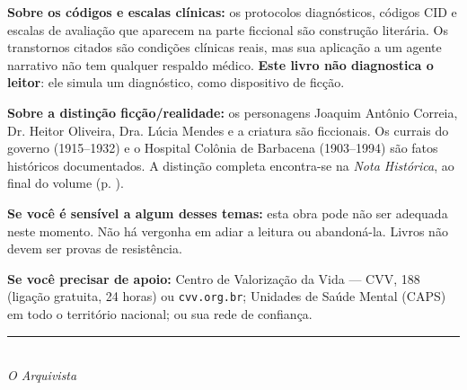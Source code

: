 \noindent \textbf{Sobre os códigos e escalas clínicas:} os protocolos diagnósticos, códigos CID e escalas de avaliação que aparecem na parte ficcional são construção literária. Os transtornos citados são condições clínicas reais, mas sua aplicação a um agente narrativo não tem qualquer respaldo médico. \textbf{Este livro não diagnostica o leitor}: ele simula um diagnóstico, como dispositivo de ficção.

\vspace{1em}

\noindent \textbf{Sobre a distinção ficção/realidade:} os personagens Joaquim Antônio Correia, Dr. Heitor Oliveira, Dra. Lúcia Mendes e a criatura são ficcionais. Os currais do governo (1915--1932) e o Hospital Colônia de Barbacena (1903--1994) são fatos históricos documentados. A distinção completa encontra-se na \textit{Nota Histórica}, ao final do volume (p. \pageref{nota-historica}).

\vspace{1em}

\noindent \textbf{Se você é sensível a algum desses temas:} esta obra pode não ser adequada neste momento. Não há vergonha em adiar a leitura ou abandoná-la. Livros não devem ser provas de resistência.

\vspace{1em}

\noindent \textbf{Se você precisar de apoio:} Centro de Valorização da Vida --- CVV, 188 (ligação gratuita, 24 horas) ou \texttt{cvv.org.br}; Unidades de Saúde Mental (CAPS) em todo o território nacional; ou sua rede de confiança.

\vspace{2.2em}
\begin{center}
{\color{sangue}\rule{0.4\paperwidth}{0.6pt}}\\[1em]
{\small\itshape O Arquivista}
\end{center}
\endgroup
\null\vfill
\clearpage
